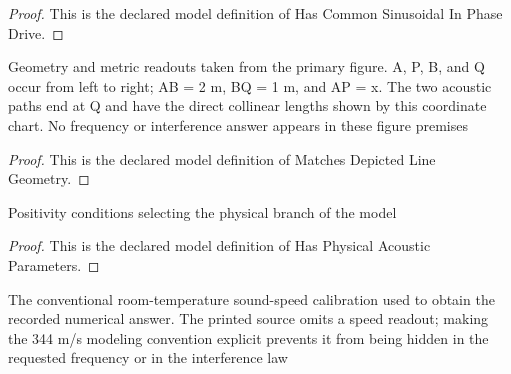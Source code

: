 \begin{proof}
  This is the declared model definition of Has Common Sinusoidal In Phase Drive.
\end{proof}
\begin{definition}
  \label{def:physics:phyx-mini-0170:phyxminiproblems-problemphyxmini0170-matchesdepictedlinegeometry}
  Geometry and metric readouts taken from the primary figure. A, P, B, and Q occur from left to right; AB = 2 m, BQ = 1 m, and AP = x. The two acoustic paths end at Q and have the direct collinear lengths shown by this coordinate chart. No frequency or interference answer appears in these figure premises
\end{definition}
\begin{proof}
  This is the declared model definition of Matches Depicted Line Geometry.
\end{proof}
\begin{definition}
  \label{def:physics:phyx-mini-0170:phyxminiproblems-problemphyxmini0170-hasphysicalacousticparameters}
  Positivity conditions selecting the physical branch of the model
\end{definition}
\begin{proof}
  This is the declared model definition of Has Physical Acoustic Parameters.
\end{proof}
\begin{definition}
  \label{def:physics:phyx-mini-0170:phyxminiproblems-problemphyxmini0170-usesstandardairsoundspeed}
  The conventional room-temperature sound-speed calibration used to obtain the recorded numerical answer. The printed source omits a speed readout; making the 344 m/s modeling convention explicit prevents it from being hidden in the requested frequency or in the interference law
\end{definition}
